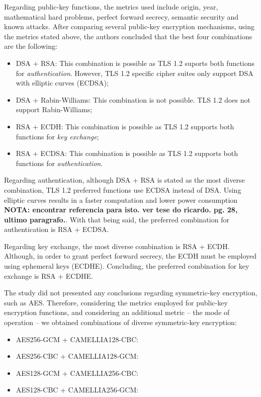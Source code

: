 \documentclass{sig-alternate-05-2015}
\begin{document}
Regarding public-key functions, the metrics used include origin, year, mathematical hard problems, perfect forward secrecy, semantic security and known attacks.
After comparing several public-key encryption mechanisms, using the metrics stated above, the authors concluded that the best four combinations are the following:
\begin{itemize}
\item {DSA + RSA: This combination is possible as TLS 1.2 suports both functions for \textit{authentication}. However, TLS 1.2 specific cipher suites only support DSA with elliptic curves (ECDSA);}
\item {DSA + Rabin-Williams: This combination is not possible. TLS 1.2 does not support Rabin-Williams;}
\item {RSA + ECDH: This combination is possible as TLS 1.2 supports both functions for \textit{key exchange};}
\item {RSA + ECDSA: This combination is possible as TLS 1.2 supports both functions for \textit{authentication}.}
\end{itemize}

Regarding authentication, although DSA + RSA is stated as the most diverse combination, TLS 1.2 preferred functions use ECDSA instead of DSA. Using elliptic curves results in a faster computation and lower power consumption \textbf{NOTA: encontrar referencia para isto. ver tese do ricardo. pg. 28, ultimo paragrafo.}. With that being said, the preferred combination for authentication is RSA + ECDSA.

Regarding key exchange, the most diverse combination is RSA + ECDH. Although, in order to grant perfect forward secrecy, the ECDH must be employed using ephemeral keys (ECDHE). Concluding, the preferred combination for key exchange is RSA + ECDHE.

The study did not presented any conclusions regarding symmetric-key encryption, such as AES. Therefore, considering the metrics employed for public-key encryption functions, and considering an additional metric -- the mode of operation -- we obtained combinations of diverse symmetric-key encryption:
\begin{itemize}
\item {AES256-GCM + CAMELLIA128-CBC: }
\item {AES256-CBC + CAMELLIA128-GCM: }
\item {AES128-GCM + CAMELLIA256-CBC: }
\item {AES128-CBC + CAMELLIA256-GCM: }
\end{itemize}
\end{document}
